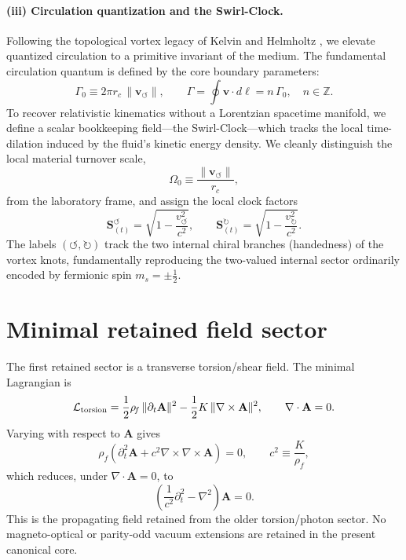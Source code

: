 \documentclass[11pt,a4paper]{article}
\newcommand{\rc}{r_c}
\newcommand{\rhoF}{\rho_{\!f}}
\begin{document}
\paragraph{(iii) Circulation quantization and the Swirl-Clock.}
Following the topological vortex legacy of Kelvin and Helmholtz \cite{Kelvin1869, Helmholtz1858}, we elevate quantized circulation to a primitive invariant of the medium. The fundamental circulation quantum is defined by the core boundary parameters:
\begin{equation}
\label{eq:Gamma0}
\boxed{
\Gamma_0 \equiv 2\pi \rc\,\lVert \mathbf{v}_{\!\boldsymbol{\circlearrowleft}}\rVert,
\qquad
\Gamma = \oint \mathbf v\cdot d\boldsymbol\ell = n\,\Gamma_0, \quad n \in \mathbb{Z}.
}
\end{equation}
To recover relativistic kinematics without a Lorentzian spacetime manifold, we define a scalar bookkeeping field---the Swirl-Clock---which tracks the local time-dilation induced by the fluid's kinetic energy density. We cleanly distinguish the local material turnover scale,
\begin{equation}
\label{eq:Omega0}
\Omega_0 \equiv \frac{\lVert \mathbf{v}_{\!\boldsymbol{\circlearrowleft}}\rVert}{\rc},
\end{equation}
from the laboratory frame, and assign the local clock factors
\begin{equation}
\label{eq:SwirlClock}
\mathbf{S}_{(t)}^{\!\boldsymbol{\circlearrowleft}} = \sqrt{1-\frac{v_{\!\boldsymbol{\circlearrowleft}}^{2}}{c^2}},
\qquad
\mathbf{S}_{(t)}^{\!\boldsymbol{\circlearrowright}} = \sqrt{1-\frac{v_{\!\boldsymbol{\circlearrowright}}^{2}}{c^2}}.
\end{equation}
The labels $(\!\boldsymbol{\circlearrowleft}, \!\boldsymbol{\circlearrowright})$ track the two internal chiral branches (handedness) of the vortex knots, fundamentally reproducing the two-valued internal sector ordinarily encoded by fermionic spin $m_s=\pm \tfrac12$.

\section{Minimal retained field sector}
The first retained sector is a transverse torsion/shear field. The minimal Lagrangian is
\begin{equation}
\label{eq:Ltorsion}
\mathcal{L}_{\rm torsion}
=
\frac12\rhoF\,\lVert \partial_t \mathbf{A}\rVert^2
-
\frac12 K\,\lVert \nabla\times\mathbf{A}\rVert^2,
\qquad
\nabla\cdot\mathbf{A}=0.
\end{equation}
Varying with respect to $\mathbf{A}$ gives
\begin{equation}
\label{eq:Awave-pre}
\rhoF\left(\partial_t^2\mathbf{A}+c^2\nabla\times\nabla\times\mathbf{A}\right)=0,
\qquad
c^2\equiv \frac{K}{\rhoF},
\end{equation}
which reduces, under $\nabla\cdot\mathbf{A}=0$, to
\begin{equation}
\label{eq:Awave}
\boxed{
\left(\frac{1}{c^2}\partial_t^2-\nabla^2\right)\mathbf{A}=0.
}
\end{equation}
This is the propagating field retained from the older torsion/photon sector. No magneto-optical or parity-odd vacuum extensions are retained in the present canonical core.
\end{document}
